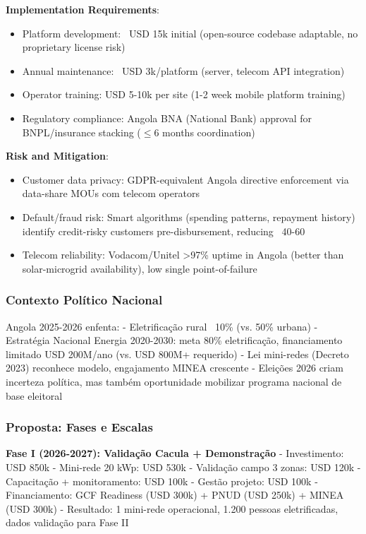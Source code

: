 \documentclass[12pt, a4paper]{article}
\begin{document}
\textbf{Implementation Requirements}:
\begin{itemize}
\item Platform development: ~USD 15k initial (open-source codebase adaptable, no proprietary license risk)
\item Annual maintenance: ~USD 3k/platform (server, telecom API integration)
\item Operator training: USD 5-10k per site (1-2 week mobile platform training)
\item Regulatory compliance: Angola BNA (National Bank) approval for BNPL/insurance stacking ($\leq$6 months coordination)
\end{itemize}

\textbf{Risk and Mitigation}:
\begin{itemize}
\item Customer data privacy: GDPR-equivalent Angola directive enforcement via data-share MOUs com telecom operators
\item Default/fraud risk: Smart algorithms (spending patterns, repayment history) identify credit-risky customers pre-disbursement, reducing ~40-60%
\item Telecom reliability: Vodacom/Unitel >97\% uptime in Angola (better than solar-microgrid availability), low single point-of-failure
\end{itemize}

\subsubsection{Contexto Político Nacional}

Angola 2025-2026 enfenta:
- Eletrificação rural ~10\% (vs. 50\% urbana)
- Estratégia Nacional Energia 2020-2030: meta 80\% eletrificação, financiamento limitado USD 200M/ano (vs. USD 800M+ requerido)
- Lei mini-redes (Decreto 2023) reconhece modelo, engajamento MINEA crescente
- Eleições 2026 criam incerteza política, mas também oportunidade mobilizar programa nacional de base eleitoral

\subsubsection{Proposta: Fases e Escalas}

\textbf{Fase I (2026-2027): Validação Cacula + Demonstração}
- Investimento: USD 850k
  - Mini-rede 20 kWp: USD 530k
  - Validação campo 3 zonas: USD 120k
  - Capacitação + monitoramento: USD 100k
  - Gestão projeto: USD 100k
- Financiamento: GCF Readiness (USD 300k) + PNUD (USD 250k) + MINEA (USD 300k)
- Resultado: 1 mini-rede operacional, 1.200 pessoas eletrificadas, dados validação para Fase II
\end{document}
